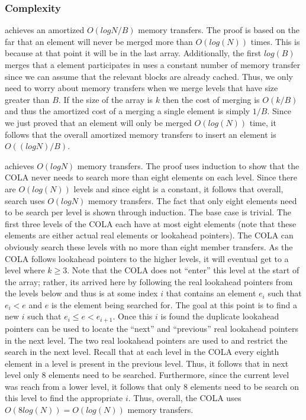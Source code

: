 \documentclass{style}
\begin{document}
\subsubsection{Complexity}

\Insert{} achieves an amortized $O(log N / B)$ memory transfers. The proof is
based on the far that an element will never be merged more than $O(log(N))$
times. This is because at that point it will be in the last array.
Additionally, the first $log(B)$ merges that a element participates in uses a
constant number of memory transfer since we can assume that the relevant
blocks are already cached. Thus, we only need to worry about memory transfers
when we merge levels that have size greater than $B$. If the size of the array
is $k$ then the cost of merging is $O(k/B)$ and thus the amortized cost of a
merging a single element is simply $1/B$. Since we just proved that an element
will only be merged $O(log(N))$ time, it follows that the overall amortized
memory transfers to insert an element is $O((log N)/B)$.

\Search{} achieves $O(log N)$ memory transfers. The proof uses induction to
show that the COLA never needs to search more than eight elements on each
level. Since there are $O(log(N))$ levels and since eight is a constant, it
follows that overall, search uses $O(log N)$ memory transfers. The fact that
only eight elements need to be search per level is shown through induction.
The base case is trivial. The first three levels of the COLA each have at most
eight elements (note that these elements are either actual real elements or
lookahead pointers). The COLA can obviously search these levels with no more
than eight member transfers. As the COLA follows lookahead pointers to the
higher levels, it will eventual get to a level where $k \geq 3$. Note that the
COLA does not ``enter'' this level at the start of the array; rather, its
arrived here by following the real lookahead pointers from the levels below
and thus is at some index $i$ that contains an element $e_i$ such that $e_i <
e$ and $e$ is the element being searched for. The goal at this point is to
find a new $i$ such that $e_i \leq e < e_{i+1}$. Once this $i$ is found the
duplicate lookahead pointers can be used to locate the ``next'' and
``previous'' real lookahead pointers in the next level. The two real lookahead
pointers are used to and restrict the search in the next level. Recall that at
each level in the COLA every eighth element in a level is present in the
previous level. Thus, it follows that in next level only 8 elements need to be
searched. Furthermore, since the current level was reach from a lower level,
it follows that only 8 elements need to be search on this level to find the
appropriate $i$. Thus, overall, the COLA uses $O(8log(N)) = O(log(N))$ memory
transfers.
\end{document}
